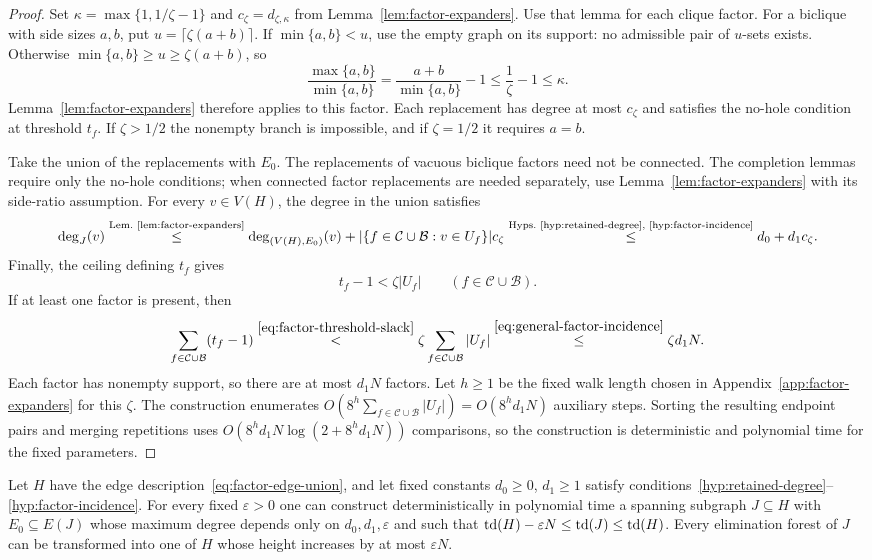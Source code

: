 \begin{proof}
Set $\kappa=\max\{1,1/\zeta-1\}$ and
$c_\zeta=d_{\zeta,\kappa}$ from Lemma~\ref{lem:factor-expanders}.
Use that lemma for each clique factor. For a biclique with side
sizes $a,b$, put $u=\lceil\zeta(a+b)\rceil$. If $\min\{a,b\}<u$,
use the empty graph on its support: no admissible pair of $u$-sets
exists. Otherwise $\min\{a,b\}\ge u\ge\zeta(a+b)$, so
\[
 \frac{\max\{a,b\}}{\min\{a,b\}}
 =\frac{a+b}{\min\{a,b\}}-1
 \le\frac1\zeta-1\le\kappa.
\]
Lemma~\ref{lem:factor-expanders} therefore applies to this factor.
Each replacement has degree at most $c_\zeta$ and satisfies the
no-hole condition at threshold $t_f$. If $\zeta>1/2$ the nonempty
branch is impossible, and if $\zeta=1/2$
it requires $a=b$.

Take the union of the replacements with $E_0$. The replacements of
vacuous biclique factors need not be connected. The completion
lemmas require only the no-hole conditions; when connected factor
replacements are needed separately, use Lemma~\ref{lem:factor-expanders}
with its side-ratio assumption.
For every $v\in V(H)$, the degree in the union satisfies
\[
 \deg_J(v)\overset{\text{Lem.~\ref{lem:factor-expanders}}}{\leq}
 \deg_{(V(H),E_0)}(v)
 +|\{f\in\mathcal C\cup\mathcal B:v\in U_f\}|c_\zeta
 \overset{\text{Hyps.~\ref{hyp:retained-degree}, \ref{hyp:factor-incidence}}}{\leq}
 d_0+d_1c_\zeta.
\]
Finally, the ceiling defining $t_f$ gives
\begin{equation}\label{eq:factor-threshold-slack}
 t_f-1<\zeta|U_f|\qquad(f\in\mathcal C\cup\mathcal B).
\end{equation}
If at least one factor is present, then
\[
 \sum_{f\in\mathcal C\cup\mathcal B}(t_f-1)
 \overset{\eqref{eq:factor-threshold-slack}}{<}
 \zeta\sum_{f\in\mathcal C\cup\mathcal B}|U_f|
 \overset{\eqref{eq:general-factor-incidence}}{\leq}\zeta d_1N.
\]
Each factor has nonempty support, so there are at most
$d_1N$ factors. Let $h\ge1$ be the fixed walk length chosen in
Appendix~\ref{app:factor-expanders} for this $\zeta$. The construction
enumerates $O(8^h\sum_{f\in\mathcal C\cup\mathcal B}|U_f|)
=O(8^h d_1N)$ auxiliary steps.
Sorting the resulting endpoint pairs and merging repetitions uses
$O(8^h d_1N\log(2+8^h d_1N))$ comparisons, so the construction
is deterministic and polynomial time for the fixed parameters.
\end{proof}

\begin{theorem}
\label{thm:td-sparsification}
Let $H$ have the edge description~\eqref{eq:factor-edge-union},
and let fixed constants $d_0\ge0$, $d_1\ge1$ satisfy
conditions~\ref{hyp:retained-degree}--\ref{hyp:factor-incidence}.
For every fixed $\varepsilon>0$
one can construct deterministically in polynomial time a spanning
subgraph $J\subseteq H$ with $E_0\subseteq E(J)$ whose maximum degree depends only on
$d_0,d_1,\varepsilon$ and such that
$\operatorname{td}(H)-\varepsilon N\le\operatorname{td}(J)\le\operatorname{td}(H)$.
Every elimination forest of $J$ can be transformed into one of
$H$ whose height increases by at most $\varepsilon N$.
\end{theorem}

